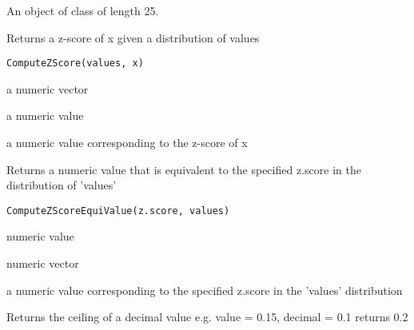 \documentclass[letterpaper]{book}
\begin{document}
%
\begin{Format}
An object of class  of length 25.
\end{Format}
%
\begin{Description}\relax
Returns a z-score of x given a distribution of values
\end{Description}
%
\begin{Usage}
\begin{verbatim}
ComputeZScore(values, x)
\end{verbatim}
\end{Usage}
%
\begin{Arguments}
\begin{ldescription}
\item[\code{values}] a numeric vector

\item[\code{x}] a numeric value
\end{ldescription}
\end{Arguments}
%
\begin{Value}
a numeric value corresponding to the z-score of x
\end{Value}
%
\begin{Description}\relax
Returns a numeric value that is equivalent to the specified z.score
in the distribution of 'values'
\end{Description}
%
\begin{Usage}
\begin{verbatim}
ComputeZScoreEquiValue(z.score, values)
\end{verbatim}
\end{Usage}
%
\begin{Arguments}
\begin{ldescription}
\item[\code{z.score}] numeric value

\item[\code{values}] numeric vector
\end{ldescription}
\end{Arguments}
%
\begin{Value}
a numeric value corresponding to the specified z.score in the 'values' distribution
\end{Value}
%
\begin{Description}\relax
Returns the ceiling of a decimal value
e.g. value = 0.15, decimal = 0.1 returns 0.2
\end{Description}
\end{document}

